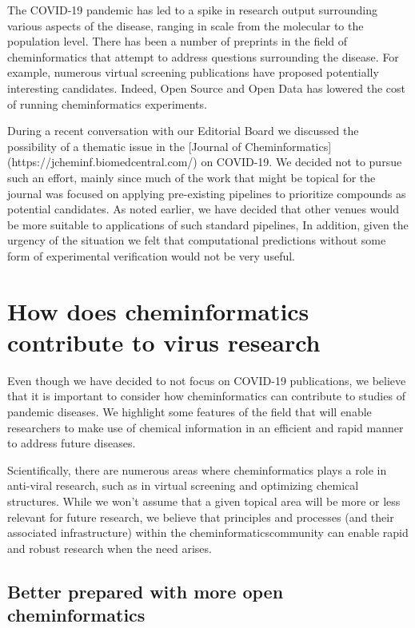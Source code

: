 \documentclass{bmcart}
\begin{document}


The COVID-19 pandemic has led to a spike in research output
surrounding various aspects of the disease, ranging in scale from the
molecular to the population level.  There has been a
number of preprints in the field of cheminformatics that attempt to
address questions surrounding the disease. For example, numerous
virtual screening publications have proposed potentially interesting
candidates. Indeed, Open Source and Open Data has lowered the cost of
running cheminformatics experiments.

During a recent conversation with our Editorial Board we discussed the
possibility of a thematic issue in the
[Journal of Cheminformatics](https://jcheminf.biomedcentral.com/) on
COVID-19. We decided not to pursue such an effort, mainly since much of
the work that might be topical for the journal was focused on applying
pre-existing pipelines to prioritize compounds as potential
candidates. As noted earlier, we have decided that other
venues would be more suitable to applications of such standard
pipelines, In addition, given the urgency of the situation we felt that
computational predictions without some form of experimental
verification would not be very useful.

\section*{How does cheminformatics contribute to virus research}

Even though we have decided to not focus on COVID-19 publications, we
believe that it is important to consider how cheminformatics can 
contribute to studies of pandemic diseases. We
highlight some features of the field that will enable researchers to
make use of chemical information in an efficient and rapid manner to
address future diseases.


Scientifically, there are numerous areas where cheminformatics plays a
role in anti-viral research, such as in virtual screening and
optimizing chemical structures. While we won't assume that a given
topical area will be more or less relevant for future research, we
believe that principles and processes (and their associated
infrastructure) within the cheminformaticscommunity  can enable rapid and robust 
research when the need arises.

\subsection*{Better prepared with more open cheminformatics}
\end{document}
